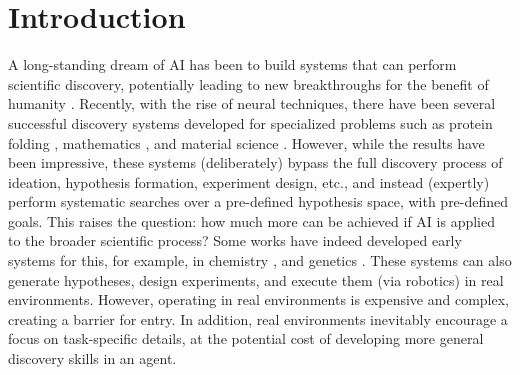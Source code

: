 
\section{Introduction}

A long-standing dream of AI has been to build systems that can perform scientific
discovery, potentially leading to new breakthroughs for the benefit of humanity \citep{kitano2016artificial}.
Recently, with the rise of neural techniques, there have been several successful discovery
systems developed for specialized problems such as protein folding \citep{Jumper2021HighlyAP,Krishna2023GeneralizedBM},
mathematics \citep{RomeraParedes2023MathematicalDF}, and material science \citep{Sendek2018MachineLD}. However, while
the results have been impressive, these systems (deliberately) bypass the full
discovery process of ideation, hypothesis formation, experiment design, etc.,
and instead (expertly) perform systematic searches over a pre-defined hypothesis space,
with pre-defined goals. This raises the question: how much more can be
achieved if AI is applied to the broader scientific process?
Some works have indeed developed early systems for this, for example, in chemistry \citep{Boiko2023AutonomousCR}, and genetics \citep{King2004FunctionalGH}.
These systems can also generate hypotheses, design experiments, and execute
them (via robotics) in real environments. However, operating in real environments is
expensive and complex, creating a barrier for entry. In addition, real environments
inevitably encourage a focus on task-specific details, at the potential cost of
developing more general discovery skills in an agent.

